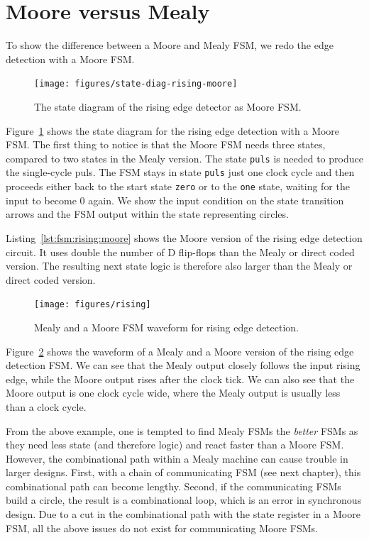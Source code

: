 \documentclass[%
    10pt,
    headinclude, footexclude,
    openright, %
    notitlepage,
    cleardoubleempty,
    headsepline,
    pointlessnumbers,
    bibtotoc, idxtotoc,
    ]{scrbook}
\newcommand{\code}[1]{{\small{\texttt{#1}}}}
\begin{document}
\section{Moore versus Mealy}

To show the difference between a Moore and Mealy FSM, we redo the edge
detection with a Moore FSM. 

\begin{figure}
  \centering
  \texttt{[image: figures/state-diag-rising-moore]}
  \caption{The state diagram of the rising edge detector as Moore FSM.}
  \label{fig:diag:rising:moore}
\end{figure}

Figure~\ref{fig:diag:rising:moore} shows the state diagram for the rising
edge detection with a Moore FSM. The first thing to notice is that the Moore FSM
needs three states, compared to two states in the Mealy version.
The state \code{puls} is needed to produce the single-cycle puls.
The FSM stays in state \code{puls} just one clock cycle and then
proceeds either back to the start state \code{zero} or to the \code{one}
state, waiting for the input to become 0 again.
We show the input condition on the state transition arrows and the
FSM output within the state representing circles.


Listing~\ref{lst:fsm:rising:moore} shows the Moore version of the rising edge detection
circuit. It uses double the number of D flip-flops than the Mealy or direct
coded version. The resulting next state logic is therefore also larger
than the Mealy or direct coded version.

\begin{figure}
  \centering
  \texttt{[image: figures/rising]}
  \caption{Mealy and a  Moore FSM waveform for rising edge detection.}
  \label{fig:rising}
\end{figure}

Figure~\ref{fig:rising} shows the waveform of a Mealy and a  Moore version
of the rising edge detection FSM. We can see that the Mealy output closely
follows the input rising edge, while the Moore output rises after the clock tick.
We can also see that the Moore output is one clock cycle wide, where the Mealy
output is usually less than a clock cycle.

From the above example, one is tempted to find Mealy FSMs the \emph{better}
FSMs as they need less state (and therefore logic) and react faster than a Moore FSM.
However, the combinational path within a Mealy machine can cause trouble in
larger designs. First, with a chain of communicating FSM (see next chapter), this
combinational path can become lengthy. Second, if the communicating FSMs build
a circle, the result is a combinational loop, which is an error in synchronous design.
Due to a cut in the combinational path with the state register in a Moore FSM,
all the above issues do not exist for communicating Moore FSMs.
\end{document}

